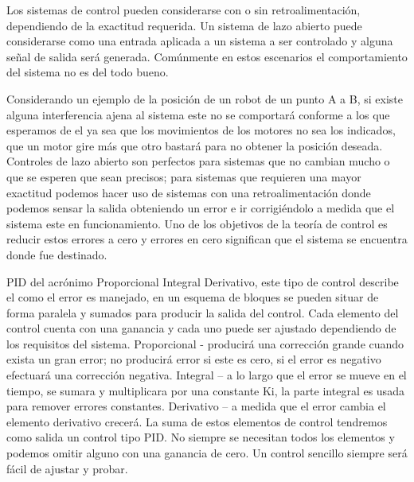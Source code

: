 \documentclass[
	12pt, %
]{fphw}
\begin{document}
Los sistemas de control pueden considerarse con o sin retroalimentación, dependiendo de la exactitud requerida. Un sistema de lazo abierto puede considerarse como una entrada aplicada a un sistema a ser controlado y alguna señal de salida será generada. Comúnmente en estos escenarios el comportamiento del sistema no es del todo bueno.

Considerando un ejemplo de la posición de un robot de un punto A a B, si existe alguna interferencia ajena al sistema este no se comportará conforme a los que esperamos de el ya sea que los movimientos de los motores no sea los indicados, que un motor gire más que otro bastará para no obtener la posición deseada. Controles de lazo abierto son perfectos para sistemas que no cambian mucho o que se esperen que sean precisos; para sistemas que requieren una mayor exactitud podemos hacer uso de sistemas con una retroalimentación donde podemos sensar la salida obteniendo un error e ir corrigiéndolo a medida que el sistema este en funcionamiento. Uno de los objetivos de la teoría de control es reducir estos errores a cero y errores en cero significan que el sistema se encuentra donde fue destinado.

PID del acrónimo Proporcional Integral Derivativo, este tipo de control describe el como el error es manejado, en un esquema de bloques se pueden situar de forma paralela y sumados para producir la salida del control. Cada elemento del control cuenta con una ganancia y cada uno puede ser ajustado dependiendo de los requisitos del sistema.
Proporcional - producirá una corrección grande cuando exista un gran error; no producirá error si este es cero, si el error es negativo efectuará una corrección negativa.
Integral – a lo largo que el error se mueve en el tiempo, se sumara y multiplicara por una constante Ki, la parte integral es usada para remover errores constantes.
Derivativo – a medida que el error cambia el elemento derivativo crecerá.
La suma de estos elementos de control tendremos como salida un control tipo PID. No siempre se necesitan todos los elementos y podemos omitir alguno con una ganancia de cero. Un control sencillo siempre será fácil de ajustar y probar.
\end{document}
